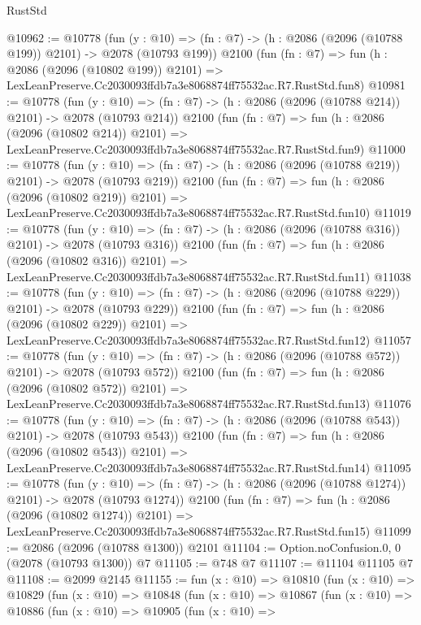 \begin{lexlean}{RustStd}
\begin{coremodule}
@10962 := @10778
    (fun (y : @10) => (fn : @7) -> (h : @2086 (@2096 (@10788 @199)) @2101) -> @2078 (@10793 @199))
    @2100
    (fun (fn : @7) =>
    fun (h : @2086 (@2096 (@10802 @199)) @2101) =>
    LexLeanPreserve.Cc2030093ffdb7a3e8068874ff75532ac.R7.RustStd.fun8)
@10981 := @10778
    (fun (y : @10) => (fn : @7) -> (h : @2086 (@2096 (@10788 @214)) @2101) -> @2078 (@10793 @214))
    @2100
    (fun (fn : @7) =>
    fun (h : @2086 (@2096 (@10802 @214)) @2101) =>
    LexLeanPreserve.Cc2030093ffdb7a3e8068874ff75532ac.R7.RustStd.fun9)
@11000 := @10778
    (fun (y : @10) => (fn : @7) -> (h : @2086 (@2096 (@10788 @219)) @2101) -> @2078 (@10793 @219))
    @2100
    (fun (fn : @7) =>
    fun (h : @2086 (@2096 (@10802 @219)) @2101) =>
    LexLeanPreserve.Cc2030093ffdb7a3e8068874ff75532ac.R7.RustStd.fun10)
@11019 := @10778
    (fun (y : @10) => (fn : @7) -> (h : @2086 (@2096 (@10788 @316)) @2101) -> @2078 (@10793 @316))
    @2100
    (fun (fn : @7) =>
    fun (h : @2086 (@2096 (@10802 @316)) @2101) =>
    LexLeanPreserve.Cc2030093ffdb7a3e8068874ff75532ac.R7.RustStd.fun11)
@11038 := @10778
    (fun (y : @10) => (fn : @7) -> (h : @2086 (@2096 (@10788 @229)) @2101) -> @2078 (@10793 @229))
    @2100
    (fun (fn : @7) =>
    fun (h : @2086 (@2096 (@10802 @229)) @2101) =>
    LexLeanPreserve.Cc2030093ffdb7a3e8068874ff75532ac.R7.RustStd.fun12)
@11057 := @10778
    (fun (y : @10) => (fn : @7) -> (h : @2086 (@2096 (@10788 @572)) @2101) -> @2078 (@10793 @572))
    @2100
    (fun (fn : @7) =>
    fun (h : @2086 (@2096 (@10802 @572)) @2101) =>
    LexLeanPreserve.Cc2030093ffdb7a3e8068874ff75532ac.R7.RustStd.fun13)
@11076 := @10778
    (fun (y : @10) => (fn : @7) -> (h : @2086 (@2096 (@10788 @543)) @2101) -> @2078 (@10793 @543))
    @2100
    (fun (fn : @7) =>
    fun (h : @2086 (@2096 (@10802 @543)) @2101) =>
    LexLeanPreserve.Cc2030093ffdb7a3e8068874ff75532ac.R7.RustStd.fun14)
@11095 := @10778
    (fun (y : @10) => (fn : @7) -> (h : @2086 (@2096 (@10788 @1274)) @2101) -> @2078 (@10793 @1274))
    @2100
    (fun (fn : @7) =>
    fun (h : @2086 (@2096 (@10802 @1274)) @2101) =>
    LexLeanPreserve.Cc2030093ffdb7a3e8068874ff75532ac.R7.RustStd.fun15)
@11099 := @2086 (@2096 (@10788 @1300)) @2101
@11104 := Option.noConfusion.{0, 0} (@2078 (@10793 @1300)) @7
@11105 := @748 @7
@11107 := @11104 @11105 @7
@11108 := @2099 @2145
@11155 := fun (x : @10) =>
  @10810
    (fun (x : @10) =>
    @10829
      (fun (x : @10) =>
      @10848
        (fun (x : @10) =>
        @10867
          (fun (x : @10) =>
          @10886
            (fun (x : @10) =>
            @10905
              (fun (x : @10) =>

\end{coremodule}
\end{lexlean}
